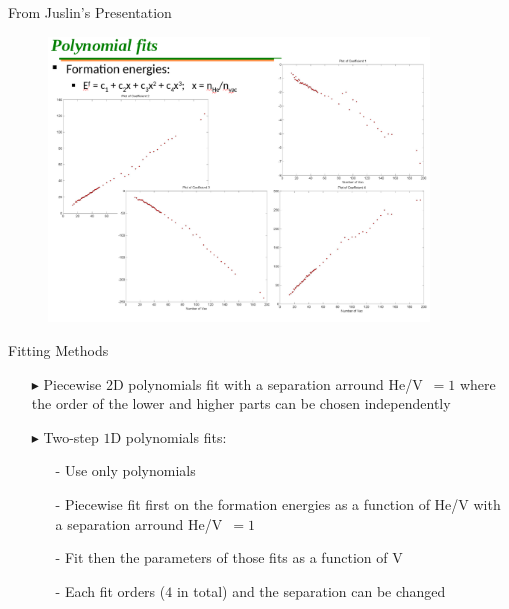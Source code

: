 \documentclass[10pt]{beamer}
\begin{document}
\begin{frame}{From Juslin's Presentation}
	\begin{figure}
        \includegraphics[width=0.9\textwidth]{fitsBrian}
    \end{figure}
\end{frame}


\begin{frame}{Fitting Methods}
	\large
    \begin{itemize}
      	\item[$\blacktriangleright$] Piecewise $2$D polynomials fit with a
      	separation arround He/V~$=1$ where the order of the lower and higher
      	parts can be chosen independently \newline
      	\item[$\blacktriangleright$] Two-step $1$D polynomials fits:
    	\begin{itemize}
      		\item[-] Use only polynomials
      		\item[-] Piecewise fit first on the formation
      		energies as a function of He/V with a separation arround He/V~$=1$
      		\item[-] Fit then the parameters of those fits as a
      		function of V
      		\item[-] Each fit orders ($4$ in total) and the
      		separation can be changed
    	\end{itemize}
    \end{itemize}
\end{frame}
\end{document}
